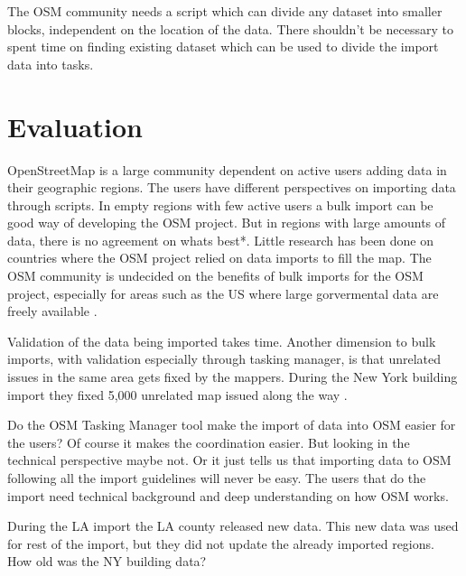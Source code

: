 The OSM community needs a script which can divide any dataset into smaller blocks, independent on the location of the data. There shouldn't be necessary to spent time on finding existing dataset which can be used to divide the import data into tasks. 


\section{Evaluation}
OpenStreetMap is a large community dependent on active users adding data in their geographic regions. The users have different perspectives on importing data through scripts. In empty regions with few active users a bulk import can be good way of developing the OSM project. But in regions with large amounts of data, there is no agreement on whats best*. Little research has been done on countries where the OSM project relied on data imports to fill the map. The OSM community is undecided on the benefits of bulk imports for the OSM project, especially for areas such as the US where large gorvermental data are freely available \cite{Zielstra2013}.

Validation of the data being imported takes time. Another dimension to bulk imports, with validation especially through tasking manager, is that unrelated issues in the same area gets fixed by the mappers. During the New York building import they fixed 5,000 unrelated map issued along the way \cite{Barth2014}. 

Do the OSM Tasking Manager tool make the import of data into OSM easier for the users? Of course it makes the coordination easier. But looking in the technical perspective maybe not. Or it just tells us that importing data to OSM following all the import guidelines will never be easy. The users that do the import need technical background and deep understanding on how OSM works. 

During the LA import the LA county released new data. This new data was used for rest of the import, but they did not update the already imported regions.  %
How old was the NY building data?

